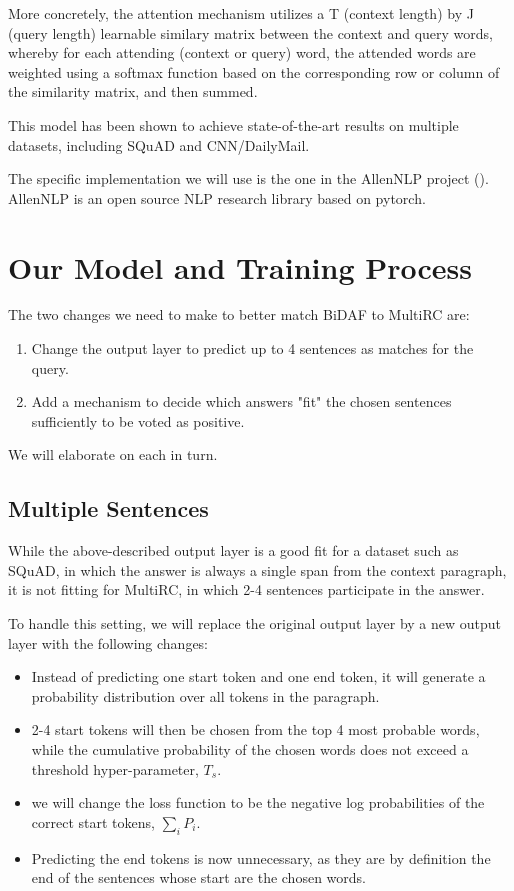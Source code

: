 \documentclass[12pt, a4paper]{article}
\begin{document}
\begin{multicols}{2}
			More concretely, the attention mechanism utilizes a T (context length) by J (query length) learnable similary matrix between the context and query words, whereby for each attending (context or query) word, the attended words are weighted using a softmax function based on the corresponding row or column of the similarity matrix, and then summed.
			
			This model has been shown to achieve state-of-the-art results on multiple datasets, including SQuAD and CNN/DailyMail.
			
			The specific implementation we will use is the one in the AllenNLP project (\cite{Gardner2017ADS}). AllenNLP is an open source NLP research library based on pytorch.
		
		\section{Our Model and Training Process}
		
			The two changes we need to make to better match BiDAF to MultiRC are:
			\begin{enumerate}
				\item Change the output layer to predict up to 4 sentences as matches for the query.
				\item Add a mechanism to decide which answers "fit" the chosen sentences sufficiently to be voted as positive.
			\end{enumerate}
			We will elaborate on each in turn.
			
			\subsection{Multiple Sentences}
		
				While the above-described output layer is a good fit for a dataset such as SQuAD, in which the answer is always a single span from the context paragraph, it is not fitting for MultiRC, in which 2-4 sentences participate in the answer.
				
				To handle this setting, we will replace the original output layer by a new output layer with the following changes:
				\begin{itemize}
					\item Instead of predicting one start token and one end token, it will generate a probability distribution over all tokens in the paragraph. 
					\item 2-4 start tokens will then be chosen from the top 4 most probable words, while the cumulative probability of the chosen words does not exceed a threshold hyper-parameter, $ T_s $.
					\item we will change the loss function to be the negative log probabilities of the correct start tokens, $ \sum_i P_i $.
					\item Predicting the end tokens is now unnecessary, as they are by definition the end of the sentences whose start are the chosen words.
				\end{itemize}
			

\end{multicols}
\end{document}
